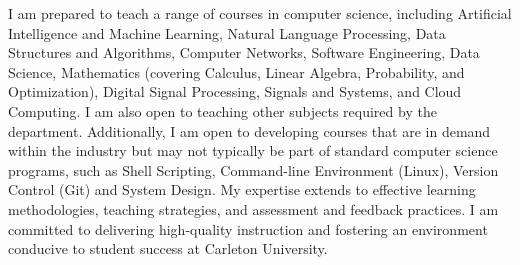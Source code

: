 \documentclass[11pt]{article}
\begin{document}



I am prepared to teach a range of courses in computer science, including Artificial Intelligence and Machine Learning, Natural Language Processing, Data Structures and Algorithms, Computer Networks, Software Engineering, Data Science, Mathematics (covering Calculus, Linear Algebra, Probability, and Optimization), Digital Signal Processing, Signals and Systems, and Cloud Computing. I am also open to teaching other subjects required by the department. Additionally, I am open to developing courses that are in demand within the industry but may not typically be part of standard computer science programs, such as Shell Scripting, Command-line Environment (Linux), Version Control (Git) and System Design.
My expertise extends to effective learning methodologies, teaching strategies, and assessment and feedback practices. I am committed to delivering high-quality instruction and fostering an environment conducive to student success at Carleton University. %




\end{document}
